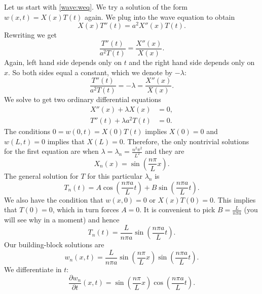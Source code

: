 Let us start with \eqref{wave:weq}.
We try a solution of the form $w(x,t) = X(x) T(t)$ again.  We plug into
the wave equation to obtain
\begin{equation*}
X(x)T''(t) = a^2 X''(x) T(t) .
\end{equation*}
Rewriting we get
\begin{equation*}
\frac{T''(t)}{a^2 T(t)} = \frac{X''(x)}{X(x)} .
\end{equation*}
Again, left hand side depends only on $t$ and the right hand side depends
only on $x$.  So both sides equal a constant, which we denote by
$-\lambda$:
\begin{equation*}
\frac{T''(t)}{a^2 T(t)} = -\lambda = \frac{X''(x)}{X(x)} .
\end{equation*}
We solve to get two ordinary differential equations
\begin{align*}
X''(x) + \lambda X(x) &= 0 , \\
T''(t) + \lambda a^2 T(t) &= 0 .
\end{align*}
The conditions $0 = w(0,t) = X(0) T(t)$ implies $X(0) = 0$ and
$w(L,t) = 0$ implies that $X(L) = 0$.  Therefore, the only nontrivial
solutions for the first equation are when
$\lambda = \lambda_n = \frac{n^2 \pi^2}{L^2}$ and they are
\begin{equation*}
X_n(x) = \sin \left( \frac{n \pi}{L} x \right) .
\end{equation*}
The general solution for $T$ for this particular $\lambda_n$ is
\begin{equation*}
T_n(t) = A \cos \left( \frac{n \pi a}{L} t \right)
+ B \sin \left( \frac{n \pi a}{L} t \right).
\end{equation*}
We also have the condition that $w(x,0) = 0$ or $X(x)T(0) = 0$.  This
implies that $T(0) = 0$, which in turn forces $A = 0$.  It is
convenient to pick $B=\frac{L}{n \pi a}$ (you will see why in a moment)
and hence
\begin{equation*}
T_n(t) = \frac{L}{n \pi a} \sin \left( \frac{n \pi a}{L} t \right).
\end{equation*}
Our building-block solutions are
\begin{equation*}
w_n(x,t) = 
\frac{L}{n \pi a} 
\sin \left( \frac{n \pi}{L} x \right)
\sin \left( \frac{n \pi a}{L} t \right) .
\end{equation*}
We differentiate in $t$:
\begin{equation*}
\frac{\partial w_n}{\partial t}(x,t) = 
\sin \left( \frac{n \pi}{L} x \right)
\cos \left( \frac{n \pi a}{L} t \right) .
\end{equation*}
